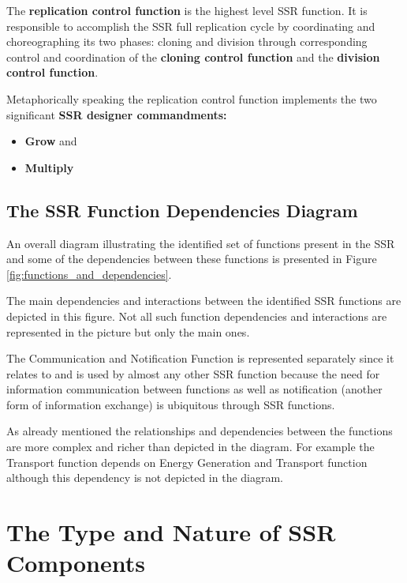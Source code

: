 \hypertarget{RefHeading3104306210128}{}The \textbf{replication control
function} is the highest level SSR function. It is responsible to
accomplish the SSR full replication cycle by coordinating and
choreographing its two phases: cloning and division through
corresponding control and coordination of the \textbf{cloning control
function} and the \textbf{division control function}.

Metaphorically speaking the replication control function implements the
two significant \textbf{SSR designer commandments:}

\begin{itemize}
\item \textbf{Grow} and
\item \textbf{Multiply}
\end{itemize}

\subsection[The SSR Function Dependencies Diagram]{The SSR Function
Dependencies Diagram}

\hypertarget{RefHeading3106306210128}{}An overall diagram illustrating
the identified set of functions present in the SSR and some of the
dependencies between these functions is presented in Figure \ref{fig:functions_and_dependencies}.

The main dependencies and interactions between the identified SSR
functions are depicted in this figure. Not all such function
dependencies and interactions are represented in the picture but only
the main ones. 

The Communication and Notification Function is represented separately
since it relates to and is used by almost any other SSR function
because the need for information communication between functions as
well as notification (another form of information exchange) is
ubiquitous through SSR functions.

As already mentioned the relationships and dependencies between the
functions are more complex and richer than depicted in the diagram. For
example the Transport function depends on Energy Generation and
Transport function although this dependency is not depicted in the
diagram.


\section{The Type and Nature of SSR Components}

